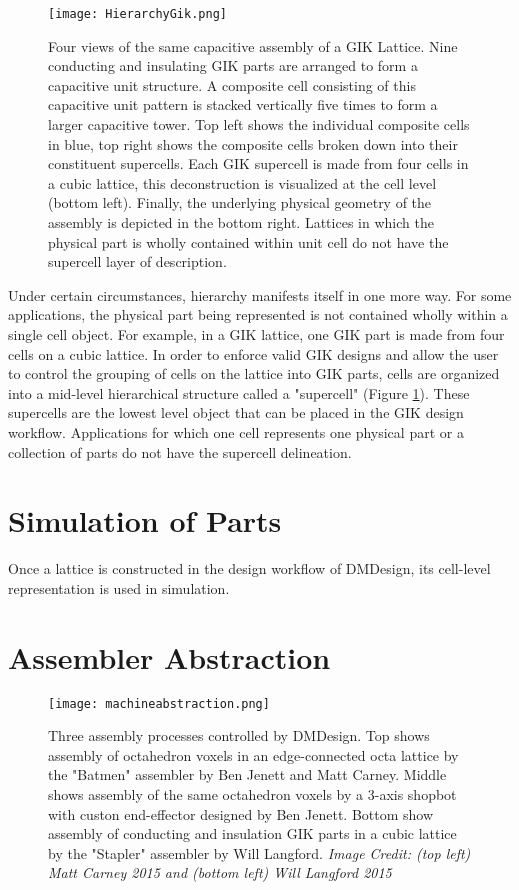 {\begin{figure}
  \texttt{[image: HierarchyGik.png]}
  \caption{Four views of the same capacitive assembly of a GIK Lattice.  Nine conducting and insulating GIK parts are arranged to form a capacitive unit structure.  A composite cell consisting of this capacitive unit pattern is stacked vertically five times to form a larger capacitive tower.  Top left shows the individual composite cells in blue, top right shows the composite cells broken down into their constituent supercells.  Each GIK supercell is made from four cells in a cubic lattice, this deconstruction is visualized at the cell level (bottom left).  Finally, the underlying physical geometry of the assembly is depicted in the bottom right.  Lattices in which the physical part is wholly contained within unit cell do not have the supercell layer of description.}
  \label{fig:HierarchyGik}
\end{figure}

Under certain circumstances, hierarchy manifests itself in one more way.  For some applications, the physical part being represented is not contained wholly within a single cell object.  For example, in a GIK lattice, one GIK part is made from four cells on a cubic lattice.  In order to enforce valid GIK designs and allow the user to control the grouping of cells on the lattice into GIK parts, cells are organized into a mid-level hierarchical structure called a "supercell" (Figure \ref{fig:HierarchyGik}).  These supercells are the lowest level object that can be placed in the GIK design workflow.  Applications for which one cell represents one physical part or a collection of parts do not have the supercell delineation.

\section{Simulation of Parts}

Once a lattice is constructed in the design workflow of DMDesign, its cell-level representation is used in simulation.

\section{Assembler Abstraction}

\begin{figure}
  \texttt{[image: machineabstraction.png]}
  \caption{Three assembly processes controlled by DMDesign.  Top shows assembly of octahedron voxels in an edge-connected octa lattice by the "Batmen" assembler by Ben Jenett and Matt Carney.  Middle shows assembly of the same octahedron voxels by a 3-axis shopbot with custon end-effector designed by Ben Jenett.  Bottom show assembly of conducting and insulation GIK parts in a cubic lattice by the "Stapler" assembler by Will Langford.  \textit{Image Credit: (top left) Matt Carney 2015 and (bottom left) Will Langford 2015}}
  \label{fig:machineabstraction}
\end{figure}

}
